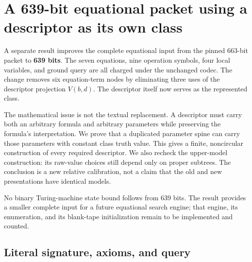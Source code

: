 \section{A 639-bit equational packet using a descriptor as its own class}
\label{sec:e639}

A separate result improves the complete equational input from the pinned
663-bit packet to \textbf{639 bits}.  The seven equations, nine operation
symbols, four local variables, and ground query are all charged under the
unchanged codec.  The change removes six equation-term nodes by eliminating
three uses of the descriptor projection $V(b,d)$.  The descriptor itself
now serves as the represented class.

The mathematical issue is not the textual replacement.  A descriptor must
carry both an arbitrary formula and arbitrary parameters while preserving
the formula's interpretation.  We prove that a duplicated parameter spine
can carry those parameters with constant class truth value.  This gives a
finite, noncircular construction of every required descriptor.  We also
recheck the upper-model construction: its raw-value choices still depend
only on proper subtrees.  The conclusion is a new relative calibration,
not a claim that the old and new presentations have identical models.

No binary Turing-machine state bound follows from 639 bits.  The result
provides a smaller complete input for a future equational search engine;
that engine, its enumeration, and its blank-tape initialization remain to
be implemented and counted.

\subsection{Literal signature, axioms, and query}


